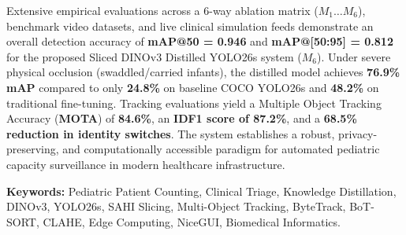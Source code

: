 Extensive empirical evaluations across a 6-way ablation matrix ($M_1 \dots M_6$), benchmark video datasets, and live clinical simulation feeds demonstrate an overall detection accuracy of \textbf{mAP@50 = 0.946} and \textbf{mAP@[50:95] = 0.812} for the proposed Sliced DINOv3 Distilled YOLO26s system ($M_6$). Under severe physical occlusion (swaddled/carried infants), the distilled model achieves \textbf{76.9\% mAP} compared to only \textbf{24.8\%} on baseline COCO YOLO26s and \textbf{48.2\%} on traditional fine-tuning. Tracking evaluations yield a Multiple Object Tracking Accuracy (\textbf{MOTA}) of \textbf{84.6\%}, an \textbf{IDF1 score of 87.2\%}, and a \textbf{68.5\% reduction in identity switches}. The system establishes a robust, privacy-preserving, and computationally accessible paradigm for automated pediatric capacity surveillance in modern healthcare infrastructure.

\vspace{0.5cm}
\textbf{Keywords:} Pediatric Patient Counting, Clinical Triage, Knowledge Distillation, DINOv3, YOLO26s, SAHI Slicing, Multi-Object Tracking, ByteTrack, BoT-SORT, CLAHE, Edge Computing, NiceGUI, Biomedical Informatics.
